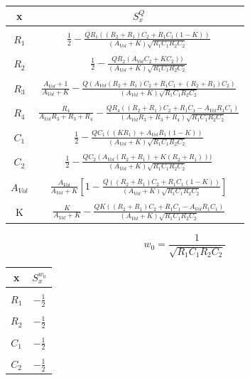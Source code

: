\begin{table}[H]
\centering
\begin{tabular}{c|c}
x         & $S^{Q}_{x}$                                                                                                                                             \\ \hline
\\
$R_{1}$   & $\frac{1}{2} - \frac{QR_{1}((R_{2}+R_{1})C_{2}+R_{1}C_{1}(1-K))}{(A_{Vol}+K)\sqrt{R_{1}C_{1}R_{2}C_{2}}}$           
\\
\\
$R_{2}$   & $\frac{1}{2} - \frac{QR_{2}(A_{Vol}C_{2}+KC_{2}))}{(A_{Vol}+K)\sqrt{R_{1}C_{1}R_{2}C_{2}}}$                                                  
\\
\\
$R_{3}$   & $\frac{A_{Vol}+1}{A_{Vol}+K} - \frac{Q(A_{Vol}(R_{2}+R_{1})C_{2}+R_{1}C_{1}+(R_{2}+R_{1})C_{2})}{(A_{Vol}+K)\sqrt{R_{1}C_{1}R_{2}C_{2}}}$
\\
\\
$R_{4}$   & $\frac{R_{4}}{A_{Vol}R_{3}+R_{3}+R_{4}} - \frac{QR_{4}((R_{2}+R_{1})C_{2}+R_{1}C_{1}-A_{Vol}R_{1}C_{1})}{(A_{Vol}R_{3}+R_{3}+R_{4})\sqrt{R_{1}C_{1}R_{2}C_{2}}}$
\\
\\
$C_{1}$   & $\frac{1}{2} - \frac{QC_{1}((KR_{1})+A_{Vol}R_{1}(1-K))}{(A_{Vol}+K)\sqrt{R_{1}C_{1}R_{2}C_{2}}}$
\\
\\
$C_{2}$   & $\frac{1}{2} - \frac{QC_{2}(A_{Vol}(R_{2}+R_{1})+K(R_{2}+R_{1})))}{(A_{Vol}+K)\sqrt{R_{1}C_{1}R_{2}C_{2}}}$
\\
\\
$A_{Vol}$ & $\frac{A_{Vol}}{A_{Vol}+K}\left [ 1 - \frac{Q((R_{2}+R_{1})C_{2}+R_{1}C_{1}(1-K))}{(A_{Vol}+K)\sqrt{R_{1}C_{1}R_{2}C_{2}}} \right ]$
\\
\\
K         & $\frac{K}{A_{Vol}+K} - \frac{QK((R_{2}+R_{1})C_{2}+R_{1}C_{1}-A_{Vol}R_{1}C_{1})}{(A_{Vol}+K)\sqrt{R_{1}C_{1}R_{2}C_{2}}}$  
\\
\end{tabular}
    \label{table:SQ}
\end{table}

$$ w_{0} = \frac{1}{\sqrt{R_{1}C_{1}R_{2}C_{2}}} $$

\begin{table}[H]
\centering
\begin{tabular}{c|c}
x       & $S^{w_{0}}_{x}$ \\ \hline
\\
$R_{1}$ & $-\frac{1}{2}$
\\
\\
$R_{2}$ & $-\frac{1}{2}$
\\
\\
$C_{1}$ & $-\frac{1}{2}$
\\
\\
$C_{2}$ & $-\frac{1}{2}$
\\
\end{tabular}
\label{table:SW}
\end{table}

